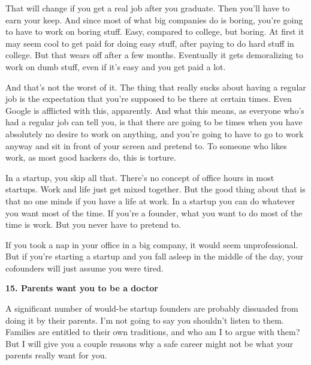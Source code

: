 That will
                    change if you get a real job after you graduate. Then you'll
                    have to earn your keep. And since most of what big companies
                    do is boring, you're going to have to work on boring stuff.
                    Easy, compared to college, but boring. At first it may seem
                    cool to get paid for doing easy stuff, after paying to do
                    hard stuff in college. But that wears off after a few
                    months. Eventually it gets demoralizing to work on dumb
                    stuff, even if it's easy and you get paid a lot.

And
                    that's not the worst of it. The thing that really sucks
                    about having a regular job is the expectation that you're
                    supposed to be there at certain times. Even Google is
                    afflicted with this, apparently. And what this means, as
                    everyone who's had a regular job can tell you, is that there
                    are going to be times when you have absolutely no desire to
                    work on anything, and you're going to have to go to work
                    anyway and sit in front of your screen and pretend to. To
                    someone who likes work, as most good hackers do, this is
                    torture.

In a startup, you skip all that. There's
                    no concept of office hours in most startups. Work and life
                    just get mixed together. But the good thing about that is
                    that no one minds if you have a life at work. In a startup
                    you can do whatever you want most of the time. If you're a
                    founder, what you want to do most of the time is work. But
                    you never have to pretend to.

If you took a nap
                    in your office in a big company, it would seem
                    unprofessional. But if you're starting a startup and you
                    fall asleep in the middle of the day, your cofounders will
                    just assume you were tired.

\textbf{15. Parents want you to be a doctor}

A significant number of would-be startup
                    founders are probably dissuaded from doing it by their
                    parents. I'm not going to say you shouldn't listen to them.
                    Families are entitled to their own traditions, and who am I
                    to argue with them? But I will give you a couple reasons why
                    a safe career might not be what your parents really want for
                    you.


